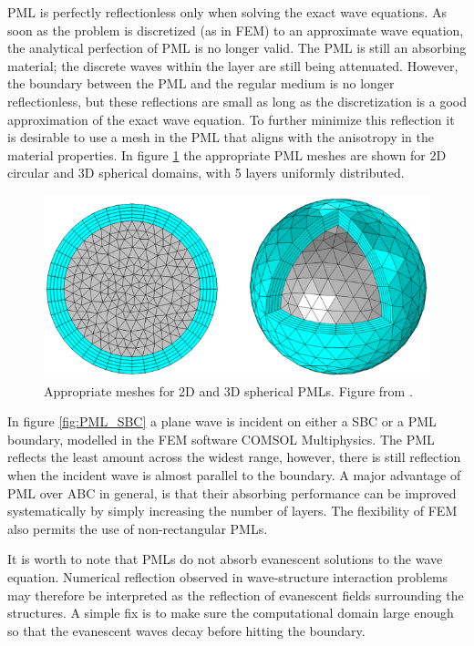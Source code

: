 PML is perfectly reflectionless only when solving the exact wave equations. As soon as the problem is discretized (as in FEM) to an approximate wave equation, the analytical perfection of PML is no longer valid. The PML is still an absorbing material; the discrete waves within the layer are still being attenuated. However, the boundary between the PML and the regular medium is no longer reflectionless, but these reflections are small as long as the discretization is a good approximation of the exact wave equation\cite{web:PML_MIT}. To further minimize this reflection it is desirable to use a mesh in the PML that aligns with the anisotropy in the material properties\cite{PML_SBC_comsol}. In figure \ref{fig:PML_mesh} the appropriate PML meshes are shown for 2D circular and 3D spherical domains, with 5 layers uniformly distributed. \text{\color{red}}

\begin{figure}[htb]
    \centering
    \includegraphics[width=0.6\linewidth]{figures/Ch2/PML_mesh.png}
    \caption{Appropriate meshes for 2D and 3D spherical PMLs. Figure from \cite{PML_SBC_comsol}.}
    \label{fig:PML_mesh}
\end{figure}

In figure \ref{fig:PML_SBC} a plane wave is incident on either a SBC or a PML boundary, modelled in the FEM software COMSOL Multiphysics\cite{PML_SBC_comsol}. The PML reflects the least amount across the widest range, however, there is still reflection when the incident wave is almost parallel to the boundary. A major advantage of PML over ABC in general, is that their absorbing performance can be improved systematically by simply increasing the number of layers\cite{FEM_TheoryAndCompOfEM_Jian-Ming_Jin}. The flexibility of FEM also permits the use of non-rectangular PMLs.

It is worth to note that PMLs do not absorb evanescent solutions to the wave equation\cite{PML_reflectionOfEvanescentWaves1}\cite{PML_reflectionOfEvanescentWaves2}. Numerical
reflection observed in wave-structure interaction problems may therefore be interpreted as the reflection of evanescent fields surrounding the structures\cite{PML_reflectionOfEvanescentWaves2}. A simple fix is to make sure the computational domain large enough so that the evanescent waves decay before hitting the boundary.


